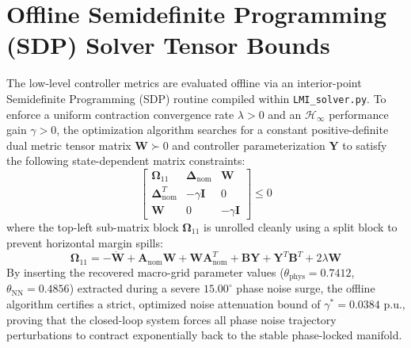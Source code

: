 \documentclass[11pt,fleqn]{article}
\begin{document}
\section{Offline Semidefinite Programming (SDP) Solver Tensor Bounds}
The low-level controller metrics are evaluated offline via an interior-point Semidefinite Programming (SDP) routine compiled within \texttt{LMI\_solver.py}. To enforce a uniform contraction convergence rate $\lambda > 0$ and an $\mathcal{H}_\infty$ performance gain $\gamma > 0$, the optimization algorithm searches for a constant positive-definite dual metric tensor matrix $\bm{W} \succ 0$ and controller parameterization $\bm{Y}$ to satisfy the following state-dependent matrix constraints:
\begin{equation}
    \begin{bmatrix}
        \bm{\Omega}_{11} & \bm{\Delta}_{\text{nom}} & \bm{W} \\
        \bm{\Delta}_{\text{nom}}^T & -\gamma \bm{I} & 0 \\
        \bm{W} & 0 & -\gamma \bm{I}
    \end{bmatrix} \le 0
\end{equation}
where the top-left sub-matrix block $\bm{\Omega}_{11}$ is unrolled cleanly using a split block to prevent horizontal margin spills:
\begin{equation}
    \bm{\Omega}_{11} = -\dot{\bm{W}} + \bm{A}_{\text{nom}}\bm{W} + \bm{W}\bm{A}_{\text{nom}}^T + \bm{B}\bm{Y} + \bm{Y}^T\bm{B}^T + 2\lambda\bm{W}
\end{equation}
By inserting the recovered macro-grid parameter values ($\theta_{\text{phys}} = 0.7412$, $\theta_{\text{NN}} = 0.4856$) extracted during a severe $15.00^\circ$ phase noise surge, the offline algorithm certifies a strict, optimized noise attenuation bound of $\gamma^* = 0.0384\text{ p.u.}$, proving that the closed-loop system forces all phase noise trajectory perturbations to contract exponentially back to the stable phase-locked manifold.
\end{document}
